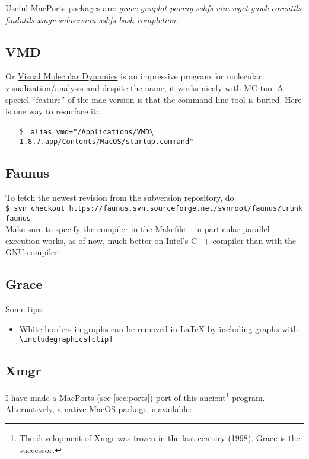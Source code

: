 \documentclass[a4paper,10pt]{article}
\begin{document}
Useful MacPorts packages are: \emph{grace gnuplot povray sshfs vim wget gawk coreutils findutils xmgr subversion sshfs bash-completion.}


\subsection{VMD}
Or \href{http://www.google.com/search?q=vmd}{Visual Molecular Dynamics} is an impressive program for molecular visualization/analysis and despite the name, it works nicely with MC too. A speciel ``feature'' of the mac version is that the command line tool is buried. Here is one way to resurface it:
\begin{itemize}
\item[\$] \verb+ alias vmd="/Applications/VMD\ 1.8.7.app/Contents/MacOS/startup.command"+
\end{itemize}

\subsection{Faunus}
To fetch the newest revision from the subversion repository, do\\

\verb+$ svn checkout https://faunus.svn.sourceforge.net/svnroot/faunus/trunk faunus+\\

\noindent Make sure to specify the compiler in the Makefile -- in particular parallel execution works, as of now, much better on Intel's C++ compiler than with the GNU compiler.

\subsection{\label{sec:grace}Grace}
Some tips:
\begin{itemize}
\item White borders in graphs can be removed in \LaTeX{} by including graphs with\\

\verb+\includegraphics[clip]+
\end{itemize}

\subsection{Xmgr}
I have made a MacPorts (see \ref{sec:ports}) port of this ancient\footnote{The development of Xmgr was frozen in the last century (1998). Grace is the successor.} program. Alternatively, a native MacOS package is available:\\
\end{document}

